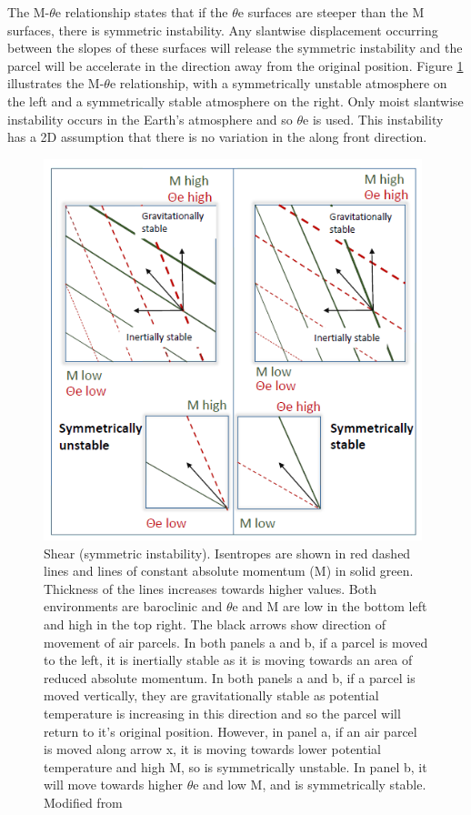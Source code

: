 The  M-$\theta$e relationship states that if the $\theta$e surfaces are steeper than the M surfaces, there is symmetric instability. Any slantwise displacement occurring between the slopes of these surfaces will release the symmetric instability and the parcel will be accelerate in the direction away from the original position. Figure \ref{fig:symm_inst} illustrates the M-$\theta$e relationship, with a symmetrically unstable atmosphere on the left and a symmetrically stable atmosphere on the right. Only moist slantwise instability occurs in the Earth's atmosphere \cite{bennetts1979conditional} and so $\theta$e is used. This instability has a 2D assumption that there is no variation in the along front direction. 


\begin{figure}
	\centering	
	\includegraphics[width=26pc,angle=0]{mocrette_diagram2_screen.png}
	\caption{Shear (symmetric instability). Isentropes are shown in red dashed lines and lines of constant absolute momentum (M) in solid green. Thickness of the lines increases towards  higher values. Both environments are baroclinic and $\theta$e and M are low in the bottom left and high in the top right. The black arrows show direction of movement of air parcels. In both panels a and b, if a parcel is moved to the left, it is inertially stable as it is moving towards an area of reduced absolute momentum. In both panels a and b, if a parcel is moved vertically, they are gravitationally stable as potential temperature is increasing in this direction and so the parcel will return to it's original position. However, in panel a, if an air parcel is moved along arrow x, it is moving towards lower potential temperature and high M, so is symmetrically unstable. In panel b, it will move towards higher $\theta$e and low M, and is symmetrically stable. Modified from \cite{morcrette2004radar}}\label{fig:symm_inst}
\end{figure}


